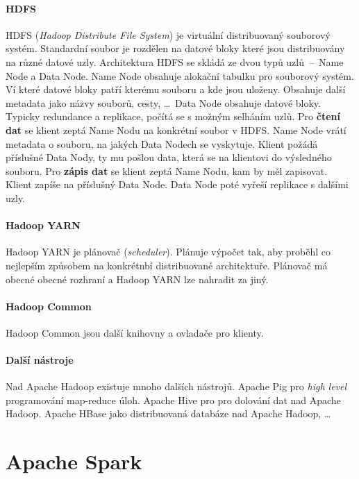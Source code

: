 \paragraph*{HDFS} HDFS (\textit{Hadoop Distribute File System}) je virtuální distribuovaný souborový systém. Standardní soubor je rozdělen na datové bloky které jsou distribuovány na různé datové uzly. Architektura HDFS se skládá ze dvou typů uzlů~--~Name Node a Data Node. Name Node obsahuje alokační tabulku pro souborový systém. Ví které datové bloky patří kterému souboru a kde jsou uloženy. Obsahuje další metadata jako názvy souborů, cesty, \dots \, Data Node obsahuje datové bloky. Typicky redundance a replikace, počítá se s možným selháním uzlů. Pro \textbf{čtení dat} se klient zeptá Name Nodu na konkrétní soubor v HDFS. Name Node vrátí metadata o souboru, na jakých Data Nodech se vyskytuje. Klient požádá příslušné Data Nody, ty mu pošlou data, která se na klientovi  do výsledného souboru. Pro \textbf{zápis dat} se klient zeptá Name Nodu, kam by měl zapisovat. Klient zapíše na příslušný Data Node. Data Node poté vyřeší replikace s dalšími uzly.

\paragraph*{Hadoop YARN} Hadoop YARN je plánovač (\textit{scheduler}). Plánuje výpočet tak, aby proběhl co nejlepším způsobem na konkrétnbí distribuované architektuře. Plánovač má obecné obecné rozhraní a Hadoop YARN lze nahradit za jiný.

\paragraph*{Hadoop Common} Hadoop Common jsou další knihovny a ovladače pro klienty.

\paragraph*{Další nástroje} Nad Apache Hadoop existuje mnoho dalších nástrojů. Apache Pig pro \textit{high level} programování map-reduce úloh. Apache Hive pro pro dolování dat nad Apache Hadoop. Apache HBase jako distribuovaná databáze nad Apache Hadoop, \dots


\section{Apache Spark}

